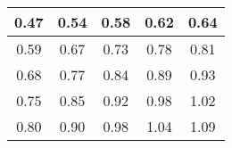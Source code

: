 \begin{large}\begin{tabular}{|c|c|c|c|c|}
\hline
0.47&0.54&0.58&0.62&0.64\\\hline
0.59&0.67&0.73&0.78&0.81\\\hline
0.68&0.77&0.84&0.89&0.93\\\hline
0.75&0.85&0.92&0.98&1.02\\\hline
0.80&0.90&0.98&1.04&1.09\\\hline
\end{tabular}
\end{large}